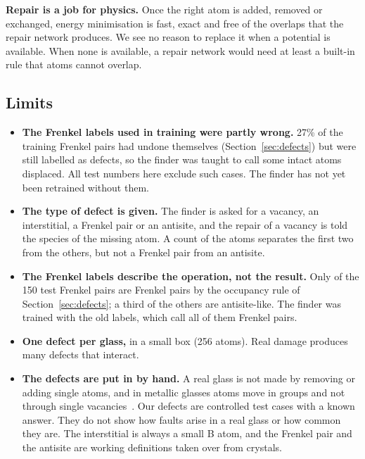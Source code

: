 \documentclass[10pt]{article}
\makeatletter
\newcommand{\pd}[1]{\@ifundefined{pd@#1}{\textcolor{red}{[#1]}}{\csname pd@#1\endcsname}}
\newif\ifablations
\makeatother
\begin{document}
\fi
\textbf{Repair is a job for physics.} Once the right atom is added, removed or exchanged, energy minimisation is fast, exact and free of the overlaps that the repair network produces. We see no reason to replace it when a potential is available. When none is available, a repair network would need at least a built-in rule that atoms cannot overlap.

\subsection{Limits}
\label{sec:limits}

\begin{itemize}
\item \textbf{The Frenkel labels used in training were partly wrong.} 27\% of the training Frenkel pairs had undone themselves (Section~\ref{sec:defects}) but were still labelled as defects, so the finder was taught to call some intact atoms displaced. All test numbers here exclude such cases. \ifablations Short training runs without them, three with different random numbers, found as many defects as the runs with them (Section~\ref{sec:ablations}), so this does not seem to hold the finder back; the finder of the main results has not been retrained without them.\else The finder has not yet been retrained without them.\fi
\item \textbf{The type of defect is given.} The finder is asked for a vacancy, an interstitial, a Frenkel pair or an antisite, and the repair of a vacancy is told the species of the missing atom. A count of the atoms separates the first two from the others, but not a Frenkel pair from an antisite.
\item \textbf{The Frenkel labels describe the operation, not the result.} Only \pd{fp-n-pair} of the 150 test Frenkel pairs are Frenkel pairs by the occupancy rule of Section~\ref{sec:defects}; a third of the others are antisite-like. The finder was trained with the old labels, which call all of them Frenkel pairs.
\item \textbf{One defect per glass,} in a small box (256 atoms). Real damage produces many defects that interact.
\item \textbf{The defects are put in by hand.} A real glass is not made by removing or adding single atoms, and in metallic glasses atoms move in groups and not through single vacancies~\citep{faupel2003}. Our defects are controlled test cases with a known answer. They do not show how faults arise in a real glass or how common they are. The interstitial is always a small B atom, and the Frenkel pair and the antisite are working definitions taken over from crystals.

\end{itemize}
\end{document}
